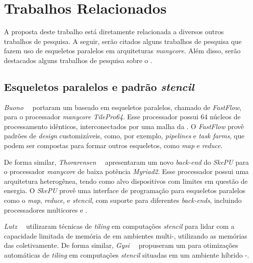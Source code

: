 \chapter{Trabalhos Relacionados}

A proposta deste trabalho está diretamente relacionada a diversos outros trabalhos de pesquisa.
A seguir, serão citados alguns trabalhos de pesquisa que fazem uso de esqueletos paralelos em
arquiteturas \textit{manycore}. Além disso, serão destacados alguns trabalhos de pesquisa sobre
o \mppa.


\section{Esqueletos paralelos e padrão \textit{stencil}}
\emph{Buono}~\etal~\cite{buono13} portaram um \fw baseado em esqueletos paralelos,
chamado de \emph{FastFlow}, para o processador \textit{manycore} \emph{TilePro64}.
Esse processador possui 64 núcleos de processamento idênticos, interconectados
por uma malha da \noc. O \fw \emph{FastFlow} provê padrões de \textit{design}
customizáveis, como, por exemplo, \textit{pipelines} e \textit{task farms},
que podem ser compostas para formar outros esqueletos, como \textit{map} e
\textit{reduce}.

De forma similar, \emph{Thorarensen}~\etal~\cite{thoraransen16} apresentaram um
novo \textit{back-end} do \fw \emph{SkePU} para o processador \textit{manycore}
de baixa potência \emph{Myriad2}. Esse processador possui uma arquitetura
heterogênea, tendo como alvo dispositivos com limites em questão de energia.
O \fw \emph{SkePU} provê uma interface de programação para esqueletos paralelos
como o \textit{map}, \textit{reduce}, e \textit{stencil}, com suporte para
diferentes \textit{back-ends}, incluindo processadores multicores e \gpus.

\emph{Lutz}~\etal~\cite{lutz13} utilizaram técnicas de \textit{tiling} em
computações \textit{stencil} para lidar com a capacidade limitada de memória
de \gpus em ambientes multi-\gpu, utilizando as memórias das \gpus
coletivamente. De forma similar, \emph{Gysi}~\etal~\cite{gysi15} propuseram um \fw
para otimizações automáticas de \textit{tiling} em computações \textit{stencil}
situadas em um ambiente híbrido \cpu{}-\gpu.


